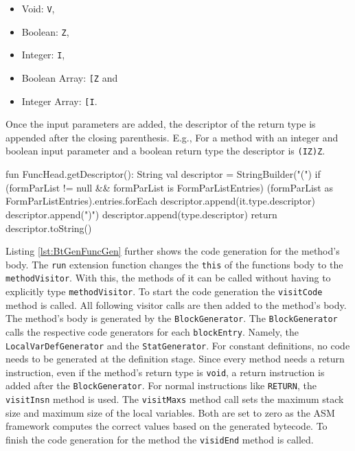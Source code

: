 \begin{itemize}
    \item Void:           \verb|V|,
    \item Boolean:        \verb|Z|,
    \item Integer:        \verb|I|,
    \item Boolean Array: \verb|[Z| and
    \item Integer Array: \verb|[I|.
\end{itemize}

Once the input parameters are added, the descriptor of the return type is appended after the closing parenthesis. E.g., For a method with an integer and boolean input parameter and a boolean return type the descriptor is \verb|(IZ)Z|.


\begin{KotlinCode}[float,numbers=none,caption=Generation of the descriptor of a method., label=lst:BtGenFuncGenDesc]
fun FuncHead.getDescriptor(): String {
    val descriptor = StringBuilder("(")
    if (formParList != null && formParList is FormParListEntries) {
        (formParList as FormParListEntries).entries.forEach {
            descriptor.append(it.type.descriptor)
        }
    }
    descriptor.append(")")
    descriptor.append(type.descriptor)
    return descriptor.toString()
}
\end{KotlinCode}

Listing \ref{lst:BtGenFuncGen} further shows the code generation for the method's body. The \verb|run| extension function changes the \verb|this| of the functions body to the \verb|methodVisitor|. With this, the methods of it can be called without having to explicitly type \verb|methodVisitor|. To start the code generation the \verb|visitCode| method is called. All following visitor calls are then added to the method's body. The method's body is generated by the \verb|BlockGenerator|. The \verb|BlockGenerator| calls the respective code generators for each \verb|blockEntry|. Namely, the \verb|LocalVarDefGenerator| and the \verb|StatGenerator|. For constant definitions, no code needs to be generated at the definition stage. Since every method needs a return instruction, even if the method's return type is \verb|void|, a return instruction is added after the \verb|BlockGenerator|. For normal instructions like \verb|RETURN|, the \verb|visitInsn| method is used. The \verb|visitMaxs| method call sets the maximum stack size and maximum size of the local variables. Both are set to zero as the ASM framework computes the correct values based on the generated bytecode. To finish the code generation for the method the \verb|visidEnd| method is called.  

